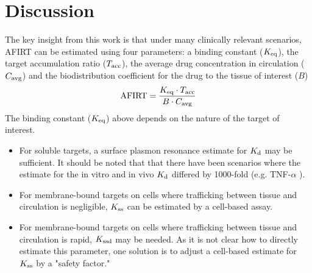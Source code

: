 \section{Discussion}

The key insight from this work is that under many clinically relevant scenarios, AFIRT can be estimated using four parameters: a binding constant ($K_\text{eq}$), the target accumulation ratio ($T_\text{acc}$), the average drug concentration in circulation ($C_\text{avg}$) and the biodistribution coefficient for the drug to the tissue of interest ($B$)
\begin{equation}
	\text{AFIRT} = \frac{K_\text{eq} \cdot T_\text{acc}}{B \cdot C_\text{avg}}
\end{equation}
The binding constant ($K_\text{eq}$) above depends on the nature of the target of interest.
\begin{itemize}
	\item For soluble targets, a surface plasmon resonance estimate for $K_\text{d}$ may be sufficient.  It should be noted that that there have been scenarios where the estimate for the in vitro and in vivo $K_\text{d}$ differed by 1000-fold (e.g. TNF-$\alpha$ \cite[Figure 8]{meno05}).
	\item For membrane-bound targets on cells where trafficking between tissue and circulation is negligible, $K_\text{ss}$ can be estimated by a cell-based assay.
	\item For membrane-bound targets on cells where trafficking between tissue and circulation is rapid, $K_\text{ssd}$ may be needed.  As it is not clear how to directly estimate this parameter, one solution is to adjust a cell-based estimate for $K_\text{ss}$ by a "safety factor."
\end{itemize}


